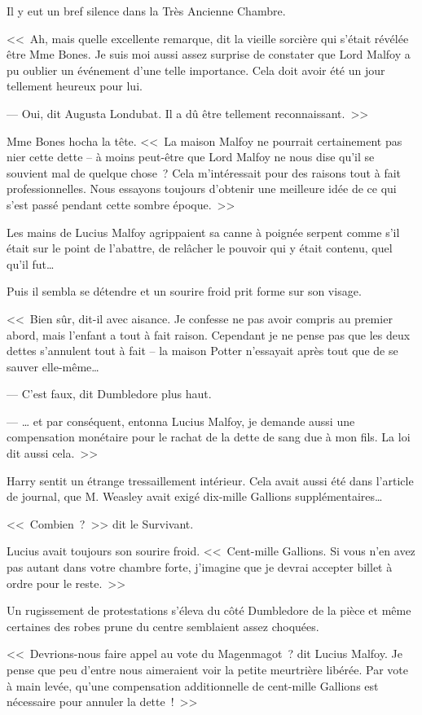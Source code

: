Il y eut un bref silence dans la Très Ancienne Chambre.

<<~Ah, mais quelle excellente remarque, dit la vieille sorcière qui s'était révélée être Mme Bones. Je suis moi aussi assez surprise de constater que Lord Malfoy a pu oublier un événement d'une telle importance. Cela doit avoir été un jour tellement heureux pour lui.

--- Oui, dit Augusta Londubat. Il a dû être tellement reconnaissant.~>>

Mme Bones hocha la tête. <<~La maison Malfoy ne pourrait certainement pas nier cette dette -- à moins peut-être que Lord Malfoy ne nous dise qu'il se souvient mal de quelque chose~? Cela m'intéressait pour des raisons tout à fait professionnelles. Nous essayons toujours d'obtenir une meilleure idée de ce qui s'est passé pendant cette sombre époque.~>>

Les mains de Lucius Malfoy agrippaient sa canne à poignée serpent comme s'il était sur le point de l'abattre, de relâcher le pouvoir qui y était contenu, quel qu'il fut…

Puis il sembla se détendre et un sourire froid prit forme sur son visage.

<<~Bien sûr, dit-il avec aisance. Je confesse ne pas avoir compris au premier abord, mais l'enfant a tout à fait raison. Cependant je ne pense pas que les deux dettes s'annulent tout à fait -- la maison Potter n'essayait après tout que de se sauver elle-même…

--- C'est faux, dit Dumbledore plus haut.

--- … et par conséquent, entonna Lucius Malfoy, je demande aussi une compensation monétaire pour le rachat de la dette de sang due à mon fils. La loi dit aussi cela.~>>

Harry sentit un étrange tressaillement intérieur. Cela avait aussi été dans l'article de journal, que M. Weasley avait exigé dix-mille Gallions supplémentaires…

<<~Combien~?~>> dit le Survivant.

Lucius avait toujours son sourire froid. <<~Cent-mille Gallions. Si vous n'en avez pas autant dans votre chambre forte, j'imagine que je devrai accepter billet à ordre pour le reste.~>>

Un rugissement de protestations s'éleva du côté Dumbledore de la pièce et même certaines des robes prune du centre semblaient assez choquées.

<<~Devrions-nous faire appel au vote du Magenmagot~? dit Lucius Malfoy. Je pense que peu d'entre nous aimeraient voir la petite meurtrière libérée. Par vote à main levée, qu'une compensation additionnelle de cent-mille Gallions est nécessaire pour annuler la dette~!~>>


